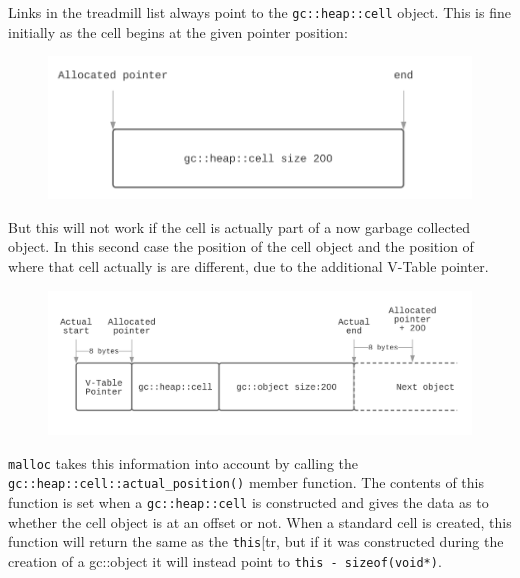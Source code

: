 \documentclass[11pt]{article}
\begin{document}
Links in the treadmill list always point to the \texttt{gc::heap::cell} object. This is fine initially as the cell begins at the given pointer position:

\begin{figure}[H]
    \begin{center}
    \includegraphics[scale=0.5]{./report_srcs/free_cell_allocation.png}
    \end{center}
\end{figure}

But this will not work if the cell is actually part of a now garbage collected object. In this second case the position of the cell object and
the position of where that cell actually is are different, due to the additional V-Table pointer.

\begin{figure}[H]
    \begin{center}
    \includegraphics[scale=0.5]{./report_srcs/full_object_allocation.png}
    \end{center}
\end{figure}

\texttt{malloc} takes this information into account by calling the \texttt{gc::heap::cell::actual\_position()} member function.
The contents of this function is set when a \texttt{gc::heap::cell} is constructed and gives the data as to whether the cell object is at an offset
or not. When a standard cell is created, this function will return the same as the \texttt{this}[tr, but if it was constructed during the creation of a
gc::object it will instead point to \texttt{this - sizeof(void*)}.
\end{document}
